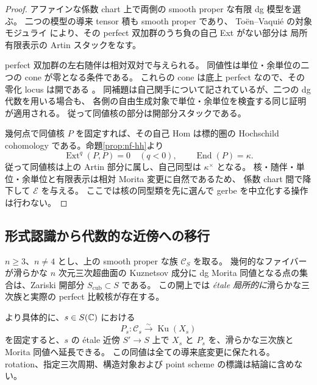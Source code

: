 \begin{proof}
アファインな係数 chart 上で両側の smooth proper な有限 dg 模型を選ぶ。
二つの模型の導来 tensor 積も smooth proper であり、
To\"en--Vaqui\'e の対象モジュライ
\cite[Corollaries~3.15, 3.21, 3.22]{NFMToenVaquieModuli}
により、その perfect 双加群のうち負の自己 Ext がない部分は
局所有限表示の Artin スタックをなす。

perfect 双加群の左右随伴は相対双対で与えられる。
同値性は単位・余単位の二つの cone が零となる条件である。
これらの cone は底上 perfect なので、その零化 locus は開である
\cite[Lemma~3.25 and its proof]{NFMToenVaquieModuli}。
同補題は自己関手について記されているが、二つの dg 代数を用いる場合も、
各側の自由生成対象で単位・余単位を検査する同じ証明が適用される。
従って同値核の部分は開部分スタックである。

幾何点で同値核 $P$ を固定すれば、その自己 Hom は標的圏の
Hochschild cohomology である。命題\ref{prop:nf-hh}より
\[
 \operatorname{Ext}^{q}(P,P)=0\quad(q<0),\qquad
 \operatorname{End}(P)=\kappa .
\]
従って同値核は上の Artin 部分に属し、自己同型は $\kappa^\times$ となる。
核・随伴・単位・余単位と有限表示は相対 Morita 変更に自然であるため、
係数 chart 間で降下して $\mathcal E$ を与える。
ここでは核の同型類を先に選んで gerbe を中立化する操作は行わない。
\end{proof}

\subsection{形式認識から代数的な近傍への移行}

\begin{theorem}
\label{grl:thm:open-locus}
$n\ge3$、$n\ne4$ とし、上の smooth proper な族 $\mathcal C_S$ を取る。
幾何的なファイバーが滑らかな $n$ 次元三次超曲面の Kuznetsov 成分に
dg Morita 同値となる点の集合は、Zariski 開部分 $S_{\mathrm{cub}}\subset S$ である。
この開上では \emph{\'etale 局所的に}滑らかな三次族と実際の perfect 比較核が存在する。

より具体的に、$s\in S(\mathbb C)$ における
\[
 P_s:\mathcal C_s\xrightarrow{\sim}\operatorname{Ku}(X_s)
\]
を固定すると、$s$ の \'etale 近傍 $S'\to S$ 上で
$X_s$ と $P_s$ を、滑らかな三次族と Morita 同値へ延長できる。
この同値は全ての導来底変更に保たれる。
rotation、指定三次周期、構造対象および point scheme の標識は結論に含めない。
\end{theorem}

